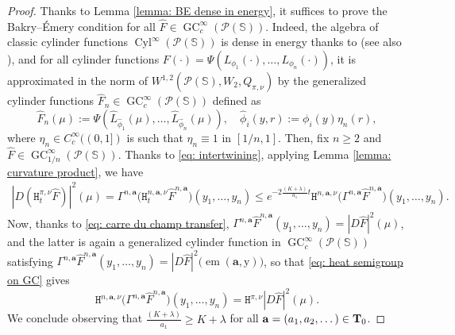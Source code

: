 \documentclass[10pt,leqno]{amsart}
\numberwithin{equation}{section}
\newcommand{\PP}{\mathcal{P}}
\newcommand{\ttH}{\mathtt{H}}
\newcommand{\Ss}{\mathbb{S}}
\begin{document}
\begin{proof}
    Thanks to Lemma \ref{lemma: BE dense in energy}, it suffices to prove the Bakry--\'Emery condition for all $\hat{F}\in \operatorname{GC}^{\infty}_c(\PP(\Ss))$. Indeed, the algebra of classic cylinder functions $\operatorname{Cyl}^\infty(\PP(\Ss))$ is dense in energy thanks to \cite[Section 6.2]{fornasier2023density} (see also \cite[Corollary 4.20]{sodini2023general}), and for all cylinder functions $F(\cdot) = \Psi (L_{\phi_1}(\cdot),\dots, L_{\phi_n}(\cdot) )$, it is approximated in the norm of $W^{1,2}(\PP(\Ss),W_2,Q_{\pi,\nu})$ by the generalized cylinder functions $\hat{F}_n \in \operatorname{GC}_c^\infty(\PP(\Ss))$ defined as 
    \[\hat{F}_n(\mu) := \Psi\left( \hat{L}_{\hat{\phi}_1}(\mu),\dots,\hat{L}_{\hat{\phi}_n}(\mu) \right), \quad \hat{\phi}_i(y,r) := \phi_i(y)\eta_n(r),\]
    where $\eta_n\in C_c^\infty((0,1])$ is such that $\eta_n \equiv 1$ in $[1/n,1]$. Then, fix $n\geq 2$ and $\hat{F}\in \operatorname{GC}_{1/n}^{\infty}(\PP(\Ss))$. Thanks to \eqref{eq: intertwining}, applying Lemma \ref{lemma: curvature product}, we have 
    \begin{align*}
         |D(\ttH^{\pi,\nu}_t \hat{F})|^2(\mu) = \Gamma^{n,\mathbf{a}}\big(\ttH^{n,\mathbf{a},\nu}_t \hat{F}^{n,\mathbf{a}}\big)(y_1,\dots,y_n) \leq e^{-2\frac{(K+\lambda)}{a_1}t} \ttH^{n,\mathbf{a},\nu}\big( \Gamma^{n,\mathbf{a}}\hat{F}^{n,\mathbf{a}} \big)(y_1,\dots,y_n).
    \end{align*}
    Now, thanks to \eqref{eq: carre du champ transfer}, $\Gamma^{n,\mathbf{a}}\hat{F}^{n,\mathbf{a}}(y_1,\dots,y_n) = |D\hat{F}|^2(\mu)$, and the latter is again a generalized cylinder function in $\operatorname{GC}_c^\infty(\PP(\Ss))$ satisfying $\Gamma^{n,\mathbf{a}}\hat{F}^{n,\mathbf{a}}(y_1,\dots,y_n) = |D\hat{F}|^2\big(\operatorname{em}(\mathbf{a},\mathrm{y})\big)$, so that \eqref{eq: heat semigroup on GC} gives
    \[\ttH^{n,\mathbf{a},\nu}\big( \Gamma^{n,\mathbf{a}}\hat{F}^{n,\mathbf{a}} \big)(y_1,\dots,y_n) = \ttH^{\pi,\nu}|D\hat{F}|^2(\mu).\]
    We conclude observing that $\frac{(K+\lambda)}{a_1} \geq K+\lambda$ for all $\mathbf{a} = (a_1,a_2,\dots) \in \bold{T}_0$.
\end{proof}
    













\normalcolor
\end{document}
